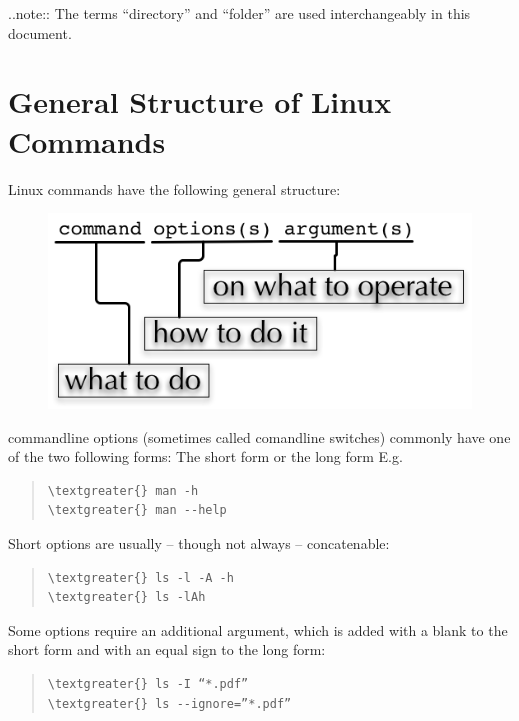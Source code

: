 \documentclass[letterpaper,10pt,english]{sphinxmanual}
\begin{document}
..note:: The terms “directory” and “folder” are used interchangeably in this document.


\section{General Structure of Linux Commands}
\label{introduction:general-structure-of-linux-commands}
Linux commands have the following general structure:
\begin{figure}[htbp]
\centering

\includegraphics{_static/LinuxCommandStructure.png}
\end{figure}

commandline options (sometimes called comandline switches) commonly have one of the two following forms: The short form  or the long form  E.g.
\begin{quote}

\begin{Verbatim}[commandchars=\\\{\}]
\textgreater{} man -h
\textgreater{} man --help
\end{Verbatim}
\end{quote}

Short options are usually – though not always – concatenable:
\begin{quote}

\begin{Verbatim}[commandchars=\\\{\}]
\textgreater{} ls -l -A -h
\textgreater{} ls -lAh
\end{Verbatim}
\end{quote}

Some options require an additional argument, which is added with a blank to the short form and with an equal sign to the long form:
\begin{quote}

\begin{Verbatim}[commandchars=\\\{\}]
\textgreater{} ls -I “*.pdf”
\textgreater{} ls --ignore=”*.pdf”
\end{Verbatim}
\end{quote}
\end{document}
